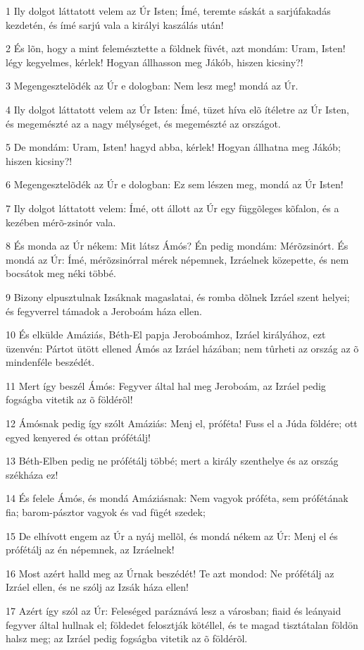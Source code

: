\par 1 Ily dolgot láttatott velem az Úr Isten; Ímé, teremte sáskát a sarjúfakadás kezdetén, és ímé sarjú vala a királyi kaszálás után!
\par 2 És lõn, hogy a mint felemésztette a földnek füvét, azt mondám: Uram, Isten! légy kegyelmes, kérlek! Hogyan állhasson meg Jákób, hiszen kicsiny?!
\par 3 Megengesztelõdék az Úr e dologban: Nem lesz meg! mondá az Úr.
\par 4 Ily dolgot láttatott velem az Úr Isten: Ímé, tüzet híva elõ ítéletre az Úr Isten, és megemészté az a nagy mélységet, és megemészté az országot.
\par 5 De mondám: Uram, Isten! hagyd abba, kérlek! Hogyan állhatna meg Jákób; hiszen kicsiny?!
\par 6 Megengesztelõdék az Úr e dologban: Ez sem lészen meg, mondá az Úr Isten!
\par 7 Ily dolgot láttatott velem: Ímé, ott állott az Úr egy függõleges kõfalon, és a kezében mérõ-zsinór vala.
\par 8 És monda az Úr nékem: Mit látsz Ámós? Én pedig mondám: Mérõzsinórt. És mondá az Úr: Ímé, mérõzsinórral mérek népemnek, Izráelnek közepette, és nem bocsátok meg néki többé.
\par 9 Bizony elpusztulnak Izsáknak magaslatai, és romba dõlnek Izráel szent helyei; és fegyverrel támadok a Jeroboám háza ellen.
\par 10 És elkülde Amáziás, Béth-El papja Jeroboámhoz, Izráel királyához, ezt üzenvén: Pártot ütött ellened Ámós az Izráel házában; nem tûrheti az ország az õ mindenféle beszédét.
\par 11 Mert így beszél Ámós: Fegyver által hal meg Jeroboám, az Izráel pedig fogságba vitetik az õ földérõl!
\par 12 Ámósnak pedig így szólt Amáziás: Menj el, próféta! Fuss el a Júda földére; ott egyed kenyered és ottan prófétálj!
\par 13 Béth-Elben pedig ne prófétálj többé; mert a király szenthelye és az ország székháza ez!
\par 14 És felele Ámós, és mondá Amáziásnak: Nem vagyok próféta, sem prófétának fia; barom-pásztor vagyok és vad fügét szedek;
\par 15 De elhívott engem az Úr a nyáj mellõl, és mondá nékem az Úr: Menj el és prófétálj az én népemnek, az Izráelnek!
\par 16 Most azért halld meg az Úrnak beszédét! Te azt mondod: Ne prófétálj az Izráel ellen, és ne szólj az Izsák háza ellen!
\par 17 Azért így szól az Úr: Feleséged paráznává lesz a városban; fiaid és leányaid fegyver által hullnak el; földedet felosztják kötéllel, és te magad tisztátalan földön halsz meg; az Izráel pedig fogságba vitetik az õ földérõl.

